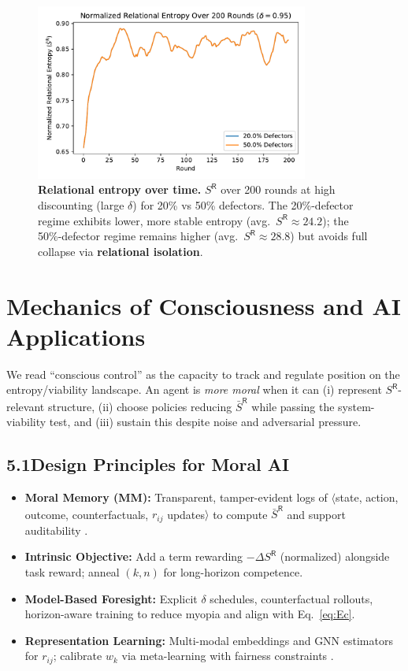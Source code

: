 \documentclass[11pt,a4paper]{article}
\begin{document}
\begin{figure}[t]
  \centering
  \includegraphics[width=0.80\textwidth]{entropy_chart.pdf}
  \caption{\textbf{Relational entropy over time.}
  $S^{\mathsf{R}}$ over 200 rounds at high discounting (large $\delta$) for 20\% vs 50\% defectors. The 20\%-defector regime exhibits lower, more stable entropy (avg.\ $S^{\mathsf{R}}\approx 24.2$); the 50\%-defector regime remains higher (avg.\ $S^{\mathsf{R}}\approx 28.8$) but avoids full collapse via \textbf{relational isolation}.}
  \label{fig:sr_over_time}
\end{figure}

\section{Mechanics of Consciousness and AI Applications}

We read ``conscious control'' as the capacity to track and regulate position on the entropy/viability landscape. An agent is \emph{more moral} when it can (i) represent $S^{\mathsf{R}}$-relevant structure, (ii) choose policies reducing $\bar S^{\mathsf{R}}$ while passing the system-viability test, and (iii) sustain this despite noise and adversarial pressure.

\subsection*{5.1\quad Design Principles for Moral AI}
\begin{itemize}
  \item \textbf{Moral Memory (MM):} Transparent, tamper-evident logs of \(\langle\)state, action, outcome, counterfactuals, $r_{ij}$ updates\(\rangle\) to compute $\bar S^{\mathsf{R}}$ and support auditability \cite{Amodei2016,IEEE2020}.
  \item \textbf{Intrinsic Objective:} Add a term rewarding \(-\Delta S^{\mathsf{R}}\) (normalized) alongside task reward; anneal $(k,n)$ for long-horizon competence.
  \item \textbf{Model-Based Foresight:} Explicit $\delta$ schedules, counterfactual rollouts, horizon-aware training to reduce myopia and align with Eq.~\ref{eq:Ec}.
  \item \textbf{Representation Learning:} Multi-modal embeddings and GNN estimators for $r_{ij}$; calibrate $w_k$ via meta-learning with fairness constraints \cite{Floridi2020,Russell2019}.
\end{itemize}
\end{document}
